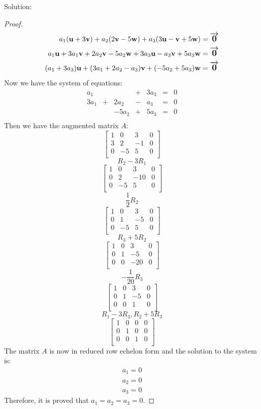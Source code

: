\documentclass{article}
\renewcommand{\u}{{\bf u}}
\renewcommand{\v}{{\bf v}}
\newcommand{\w}{{\bf w}}
\newcommand{\zero}{\mbox{\large $\overrightarrow{\mathbf{0}}$}}
\theoremstyle{definition}
\begin{document}
Solution:
\begin{proof}
\begin{align*}
    a_1(\u+3\v)+a_2(2\v-5\w)+a_3(3\u-\v+5\w)&=\zero \\
    a_1\u+3a_1\v+2a_2\v-5a_2\w+3a_3\u-a_3\v+5a_3\w&=\zero \\
    (a_1+3a_3)\u+(3a_1+2a_2-a_3)\v+(-5a_2+5a_3)\w&=\zero
\end{align*}
Now we have the system of equations:
\[\begin{array}{ccccccc}
    a_1 &  &  & + & 3a_3 & = & 0 \\
    3a_1 & + & 2a_2 & - & a_3 & = & 0 \\
     &  & -5a_2 & + & 5a_3 & = &0 \\
\end{array}\]
Then we have the augmented matrix \(A\):
\[\left[
\begin{array}{ccc|c}
    1 & 0 & 3 & 0 \\
    3 & 2 & -1 & 0 \\
    0 & -5 & 5 & 0 \\
\end{array}
\right]\]
\[R_2-3R_1\]
\[\left[
\begin{array}{ccc|c}
    1 & 0 & 3 & 0 \\
    0 & 2 & -10 & 0 \\
    0 & -5 & 5 & 0 \\
\end{array}
\right]\]
\[\frac{1}{2}R_2\]
\[\left[
\begin{array}{ccc|c}
    1 & 0 & 3 & 0 \\
    0 & 1 & -5 & 0 \\
    0 & -5 & 5 & 0 \\
\end{array}
\right]\]
\[R_3+5R_2\]
\[\left[
\begin{array}{ccc|c}
    1 & 0 & 3 & 0 \\
    0 & 1 & -5 & 0 \\
    0 & 0 & -20 & 0 \\
\end{array}
\right]\]
\[-\frac{1}{20}R_3\]
\[\left[
\begin{array}{ccc|c}
    1 & 0 & 3 & 0 \\
    0 & 1 & -5 & 0 \\
    0 & 0 & 1 & 0 \\
\end{array}
\right]\]
\[R_1-3R_3, R_2+5R_3\]
\[\left[
\begin{array}{ccc|c}
    1 & 0 & 0 & 0 \\
    0 & 1 & 0 & 0 \\
    0 & 0 & 1 & 0 \\
\end{array}
\right]\]
The matrix \(A\) is now in reduced row echelon form and the solution to the system is:
\begin{align*}
    a_1=0 \\
    a_2=0 \\
    a_3=0
\end{align*}
Therefore, it is proved that \(a_1 = a_2 = a_3 = 0\).
\end{proof}
\end{document}
